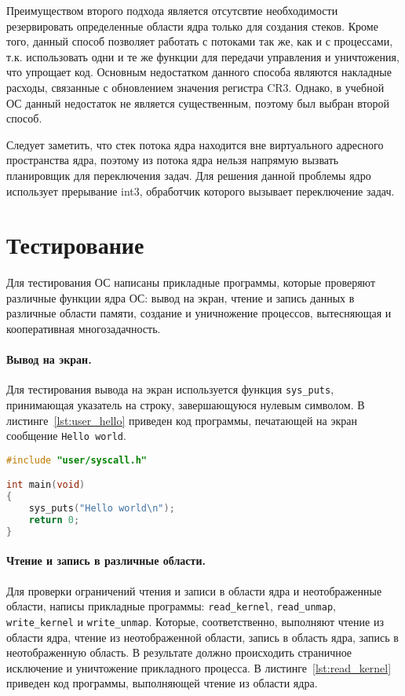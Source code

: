 Преимуществом второго подхода является отсутсвтие необходимости резервировать определенные
области ядра только для создания стеков. Кроме того, данный способ позволяет работать с потоками
так же, как и с процессами, т.к. использовать одни и те же функции для передачи управления и
уничтожения, что упрощает код. Основным недостатком данного способа являются накладные расходы,
связанные с обновлением значения регистра CR3. Однако, в учебной ОС данный недостаток не является
существенным, поэтому был выбран второй способ.

Следует заметить, что стек потока ядра находится вне виртуального адресного пространства ядра,
поэтому из потока ядра нельзя напрямую вызвать планировщик для переключения задач. Для решения данной
проблемы ядро использует прерывание int3, обработчик которого вызывает переключение задач.

\section{Тестирование}
Для тестирования ОС написаны прикладные программы, которые проверяют различные функции ядра ОС:
вывод на экран, чтение и запись данных в различные области памяти, создание и уничножение
процессов, вытесняющая и кооперативная многозадачность.

\paragraph{Вывод на экран.} Для тестирования вывода на экран используется функция \texttt{sys\_puts},
принимающая указатель на строку, завершающуюся нулевым символом. В листинге~\ref{lst:user_hello} приведен
код программы, печатающей на экран сообщение \texttt{Hello world}.

\begin{lstlisting}[language=C, caption={Использование функции \texttt{sys\_puts}}, label={lst:user_hello}]
#include "user/syscall.h"

int main(void)
{
	sys_puts("Hello world\n");
	return 0;
}
\end{lstlisting}

\paragraph{Чтение и запись в различные области.} Для проверки ограничений чтения и записи в
области ядра и неотображенные области, написы прикладные программы: \texttt{read\_kernel},
\texttt{read\_unmap}, \texttt{write\_kernel} и \texttt{write\_unmap}. Которые, соответственно,
выполняют чтение из области ядра, чтение из неотображенной области, запись в область ядра,
запись в неотображенную область. В результате должно происходить страничное исключение и
уничтожение прикладного процесса. В листинге~\ref{lst:read_kernel} приведен код программы,
выполняющей чтение из области ядра.

